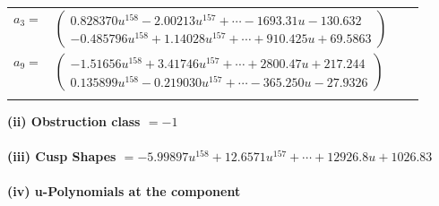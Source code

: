 \documentclass[1p]{elsarticle_modified}
\theoremstyle{definition}
\begin{document}
\begin{tabular}{m{7pt} m{180pt} m{7pt} m{180pt} }
\flushright $a_{3}=$&$\begin{pmatrix}0.828370 u^{158}-2.00213 u^{157}+\cdots-1693.31 u-130.632\\-0.485796 u^{158}+1.14028 u^{157}+\cdots+910.425 u+69.5863\end{pmatrix}$ \\
\flushright $a_{9}=$&$\begin{pmatrix}-1.51656 u^{158}+3.41746 u^{157}+\cdots+2800.47 u+217.244\\0.135899 u^{158}-0.219030 u^{157}+\cdots-365.250 u-27.9326\end{pmatrix}$\\&\end{tabular}
\flushleft \textbf{(ii) Obstruction class $= -1$}\\~\\
\flushleft \textbf{(iii) Cusp Shapes $= -5.99897 u^{158}+12.6571 u^{157}+\cdots+12926.8 u+1026.83$}\\~\\
\newpage\renewcommand{\arraystretch}{1}
\flushleft \textbf{(iv) u-Polynomials at the component}\newline \\
\end{document}
